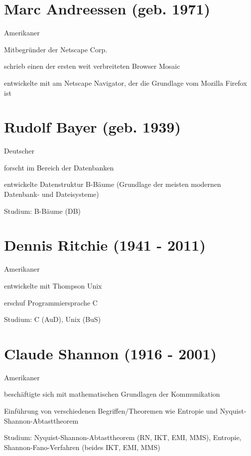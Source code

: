 \documentclass[a4paper,12pt]{report}
\begin{document}
\section*{Marc Andreessen (geb. 1971)}
\begin{itemize*}
	\item Amerikaner
	\item Mitbegründer der Netscape Corp.
	\item schrieb einen der ersten weit verbreiteten Browser Mosaic
	\item entwickelte mit am Netscape Navigator, der die Grundlage vom Mozilla Firefox ist
\end{itemize*}

\section*{Rudolf Bayer (geb. 1939)}
\begin{itemize*}
	\item Deutscher
	\item forscht im Bereich der Datenbanken
	\item entwickelte Datenstruktur B-Bäume (Grundlage der meisten modernen Datenbank- und Dateisysteme)
	\item Studium: B-Bäume (DB)
\end{itemize*}

\section*{Dennis Ritchie (1941 - 2011)}
\begin{itemize*}
	\item Amerikaner
	\item entwickelte mit Thompson Unix
	\item erschuf Programmiersprache C
	\item Studium: C (AuD), Unix (BuS)
\end{itemize*}

\section*{Claude Shannon (1916 - 2001)}
\begin{itemize*}
	\item Amerikaner
	\item beschäftigte sich mit mathematischen Grundlagen der Kommunikation
	\item Einführung von verschiedenen Begriffen/Theoremen wie Entropie und Nyquist-Shannon-Abtasttheorem
	\item Studium: Nyquist-Shannon-Abtasttheorem (RN, IKT, EMI, MMS), Entropie, Shannon-Fano-Verfahren (beides IKT, EMI, MMS)
\end{itemize*}
\end{document}
